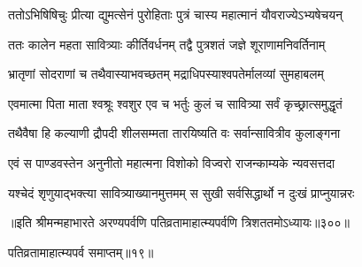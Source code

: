\twolineshloka
{ततोऽभिषिषिचुः प्रीत्या द्युमत्सेनं पुरोहिताः}
{पुत्रं चास्य महात्मानं यौवराज्येऽभ्यषेचयन्}


\twolineshloka
{ततः कालेन महता सावित्र्याः कीर्तिवर्धनम्}
{तद्वै पुत्रशतं जज्ञे शूराणामनिवर्तिनाम्}


\twolineshloka
{भ्रातृणां सोदराणां च तथैवास्याभवच्छतम्}
{मद्राधिपस्याश्वपतेर्मालव्यां सुमहाबलम्}


\twolineshloka
{एवमात्मा पिता माता श्वश्रूः श्वशुर एव च}
{भर्तुः कुलं च सावित्र्या सर्वं कृच्छ्रात्समुद्धृतं}


\twolineshloka
{तथैवैषा हि कल्याणी द्रौपदी शीलसम्मता}
{तारयिष्यति वः सर्वान्सावित्रीव कुलाङ्गना}




\twolineshloka
{एवं स पाण्डवस्तेन अनुनीतो महात्मना}
{विशोको विज्वरो राजन्काम्यके न्यवसत्तदा}


\twolineshloka
{यश्चेदं शृणुयाद्भक्त्या सावित्र्याख्यानमुत्तमम्}
{स सुखी सर्वसिद्धार्थो न दुःखं प्राप्नुयान्नरः}


॥इति श्रीमन्महाभारते अरण्यपर्वणि पतिव्रतामाहात्म्यपर्वणि त्रिशततमोऽध्यायः॥३००॥

पतिव्रतामाहात्म्यपर्व समाप्तम्॥१९॥ 
